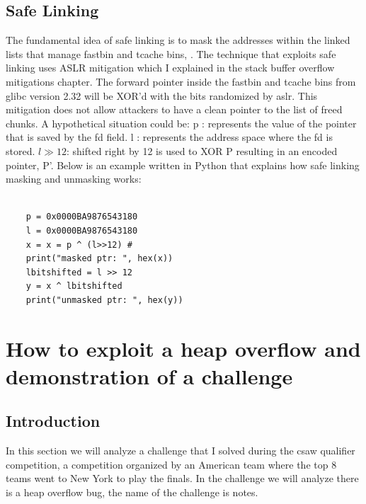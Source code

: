     \subsection{Safe Linking}
    The fundamental idea of safe linking is to mask the addresses within the linked lists that manage fastbin and tcache bins, \cite{Bypassingsl}.\newline
    The technique that exploits safe linking uses ASLR mitigation which I explained in the stack buffer overflow mitigations chapter.\newline
    The forward pointer inside the fastbin and tcache bins from glibc version 2.32 will be XOR'd with the bits randomized by aslr.
    This mitigation does not allow attackers to have a clean pointer to the list of freed chunks.
    A hypothetical situation could be: \newline
    p : represents the value of the pointer that is saved by the fd field.\newline
    l : represents the address space where the fd is stored.\newline
    \( l \gg 12 \):  shifted right by 12 is used to XOR P resulting in an encoded pointer, P'.\newline
    Below is an example written in Python that explains how safe linking masking and unmasking works: \newline
    \begin{verbatim}

    p = 0x0000BA9876543180
    l = 0x0000BA9876543180
    x = x = p ^ (l>>12) # 
    print("masked ptr: ", hex(x))
    lbitshifted = l >> 12 
    y = x ^ lbitshifted
    print("unmasked ptr: ", hex(y))
    \end{verbatim}
    \clearpage
        
    \section{How to exploit a heap overflow and demonstration of a challenge}
    \subsection{Introduction}
    In this section we will analyze a challenge that I solved during the csaw qualifier competition, a competition organized by an American team where the top 8 teams went to New York to play the finals.\newline
    In the challenge we will analyze there is a heap overflow bug, the name of the challenge is notes. \newline
